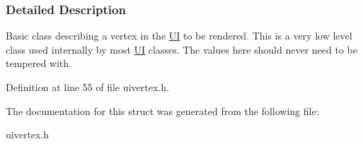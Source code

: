 \subsubsection{Detailed Description}
Basic class describing a vertex in the \hyperlink{namespaceMezzanine_1_1UI}{UI} to be rendered. This is a very low level class used internally by most \hyperlink{namespaceMezzanine_1_1UI}{UI} classes. The values here should never need to be tempered with. 

Definition at line 55 of file uivertex.h.



The documentation for this struct was generated from the following file:\begin{DoxyCompactItemize}
\item 
uivertex.h\end{DoxyCompactItemize}
